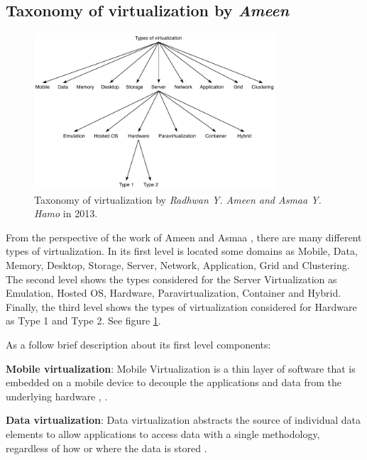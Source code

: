 	\subsection{Taxonomy of virtualization by \textit{Ameen}}
	
	\begin{figure}[!hbtp]
		\centering
		\includegraphics[width=9cm]{images/AmeenAndHamo2003.pdf}
		\vspace{-0.2cm}
		\caption{Taxonomy of virtualization by \textit{Radhwan Y. Ameen and Asmaa Y. Hamo} in 2013\footnotemark[10]{}.}
		\label{fig:TaxonomyOfVirtualizationByAmeen}
	\end{figure}
	

    From the perspective of the work of Ameen and Asmaa \cite{Ameen2013}, there are many different types of virtualization. In its first level is located some domains as  Mobile, Data, Memory, Desktop, Storage, Server, Network, Application, Grid and Clustering. The second level shows the types considered for the Server Virtualization as Emulation, Hosted OS, Hardware, Paravirtualization, Container and Hybrid. Finally, the third level shows the types of virtualization considered for Hardware as Type 1 and Type 2. See figure \ref{fig:TaxonomyOfVirtualizationByAmeen}.
    
    As a follow brief description about its first level components:
    
    \textbf{Mobile virtualization}: Mobile Virtualization is a thin layer of software that is embedded on a mobile device to decouple the applications and data from the underlying hardware \cite{Ameen2013}, \cite{VMware2018Website}. 
    
    \textbf{Data virtualization}: Data virtualization abstracts the source of individual data elements to allow applications to access data with a single methodology, regardless of how or where the data is stored \cite{Mann2006}.
   
